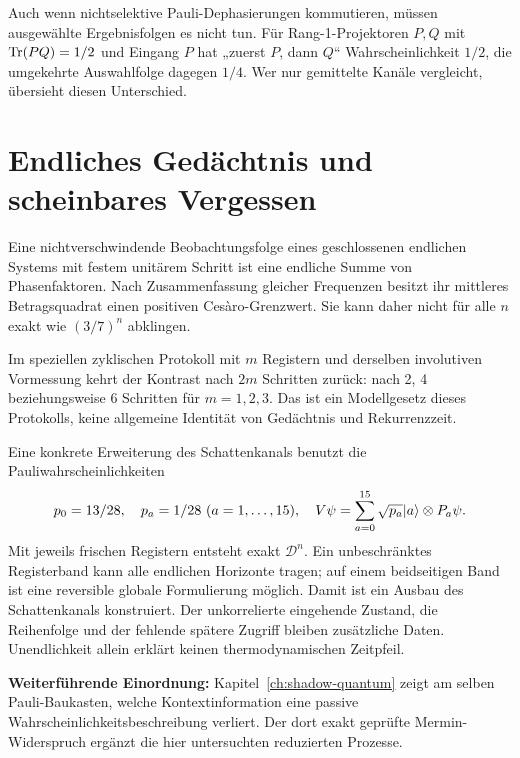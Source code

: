 Auch wenn nichtselektive Pauli-Dephasierungen kommutieren, müssen ausgewählte Ergebnisfolgen es nicht tun. Für Rang-1-Projektoren $P,Q$ mit $\operatorname{Tr}(PQ)=1/2$ und Eingang $P$ hat „zuerst $P$, dann $Q$“ Wahrscheinlichkeit $1/2$, die umgekehrte Auswahlfolge dagegen $1/4$. Wer nur gemittelte Kanäle vergleicht, übersieht diesen Unterschied.

\section{Endliches Gedächtnis und scheinbares Vergessen}
Eine nichtverschwindende Beobachtungsfolge eines geschlossenen endlichen Systems mit festem unitärem Schritt ist eine endliche Summe von Phasenfaktoren. Nach Zusammenfassung gleicher Frequenzen besitzt ihr mittleres Betragsquadrat einen positiven Cesàro-Grenzwert. Sie kann daher nicht für alle $n$ exakt wie $(3/7)^n$ abklingen.

Im speziellen zyklischen Protokoll mit $m$ Registern und derselben involutiven Vormessung kehrt der Kontrast nach $2m$ Schritten zurück: nach 2, 4 beziehungsweise 6 Schritten für $m=1,2,3$. Das ist ein Modellgesetz dieses Protokolls, keine allgemeine Identität von Gedächtnis und Rekurrenzzeit.

Eine konkrete Erweiterung des Schattenkanals benutzt die Pauliwahrscheinlichkeiten
\begin{equation}
p_0=13/28,\quad p_a=1/28\ (a=1,\ldots,15),\quad
V\psi=\sum_{a=0}^{15}\sqrt{p_a}\lvert a\rangle\otimes P_a\psi.
\end{equation}
Mit jeweils frischen Registern entsteht exakt $\mathcal D^n$. Ein unbeschränktes Registerband kann alle endlichen Horizonte tragen; auf einem beidseitigen Band ist eine reversible globale Formulierung möglich. Damit ist ein Ausbau des Schattenkanals konstruiert. Der unkorrelierte eingehende Zustand, die Reihenfolge und der fehlende spätere Zugriff bleiben zusätzliche Daten. Unendlichkeit allein erklärt keinen thermodynamischen Zeitpfeil. 

\par\noindent\textbf{Weiterführende Einordnung:} Kapitel~\ref{ch:shadow-quantum} zeigt am selben Pauli-Baukasten, welche Kontextinformation eine passive Wahrscheinlichkeitsbeschreibung verliert. Der dort exakt geprüfte Mermin-Widerspruch ergänzt die hier untersuchten reduzierten Prozesse.
